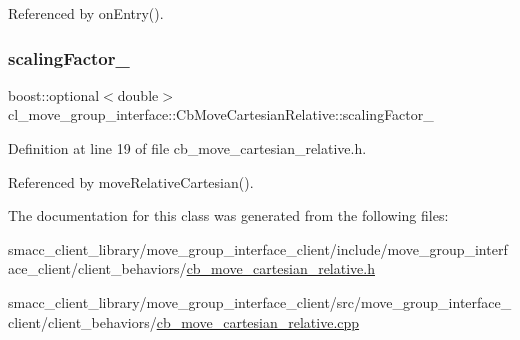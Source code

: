 Referenced by on\+Entry().

\mbox{\label{classcl__move__group__interface_1_1CbMoveCartesianRelative_a2b5e5f05bce94dd3078abfd306c6ef39}} 
\subsubsection{\texorpdfstring{scaling\+Factor\+\_\+}{scalingFactor\_}}
{\footnotesize\ttfamily boost\+::optional$<$double$>$ cl\+\_\+move\+\_\+group\+\_\+interface\+::\+Cb\+Move\+Cartesian\+Relative\+::scaling\+Factor\+\_\+}



Definition at line 19 of file cb\+\_\+move\+\_\+cartesian\+\_\+relative.\+h.



Referenced by move\+Relative\+Cartesian().



The documentation for this class was generated from the following files\+:\begin{DoxyCompactItemize}
\item 
smacc\+\_\+client\+\_\+library/move\+\_\+group\+\_\+interface\+\_\+client/include/move\+\_\+group\+\_\+interface\+\_\+client/client\+\_\+behaviors/\hyperlink{cb__move__cartesian__relative_8h}{cb\+\_\+move\+\_\+cartesian\+\_\+relative.\+h}\item 
smacc\+\_\+client\+\_\+library/move\+\_\+group\+\_\+interface\+\_\+client/src/move\+\_\+group\+\_\+interface\+\_\+client/client\+\_\+behaviors/\hyperlink{cb__move__cartesian__relative_8cpp}{cb\+\_\+move\+\_\+cartesian\+\_\+relative.\+cpp}\end{DoxyCompactItemize}
